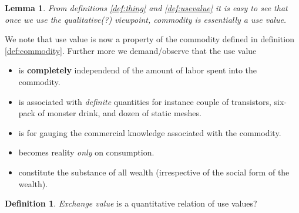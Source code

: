 \documentclass[12pt]{extarticle}
\newtheorem{lemma}[theorem]{Lemma}
\theoremstyle{definition}
\newtheorem{definition}{Definition}[section]
\newenvironment{remark}[1][Remark]{\begin{trivlist}
\item[\hskip \labelsep {\bfseries #1}]}{\end{trivlist}}
\begin{document}
  \begin{lemma}
    From definitions \ref{def:thing} and \ref{def:usevalue} it is easy to see that once we use the qualitative(?) viewpoint, commodity is essentially a use value.
  \end{lemma}
  \begin{remark}
    We note that use value is now a property of the commodity defined in definition \ref{def:commodity}.  Further more we demand/observe that the use value
    \begin{itemize}
    \item is \textbf{completely} independend of the amount of labor spent into the commodity.
    \item  is associated with \emph{definite} quantities for instance couple of transistors, six-pack of monster drink, and dozen of static meshes.
    \item is for gauging the commercial knowledge associated with the commodity.
    \item becomes reality \emph{only} on consumption.
      \item constitute the substance of all wealth (irrespective of the social form of the wealth).
    \end{itemize}
  \end{remark}

  \begin{definition}
    \emph{Exchange value} is a quantitative relation of use values?
    \end{definition}
\end{document}
